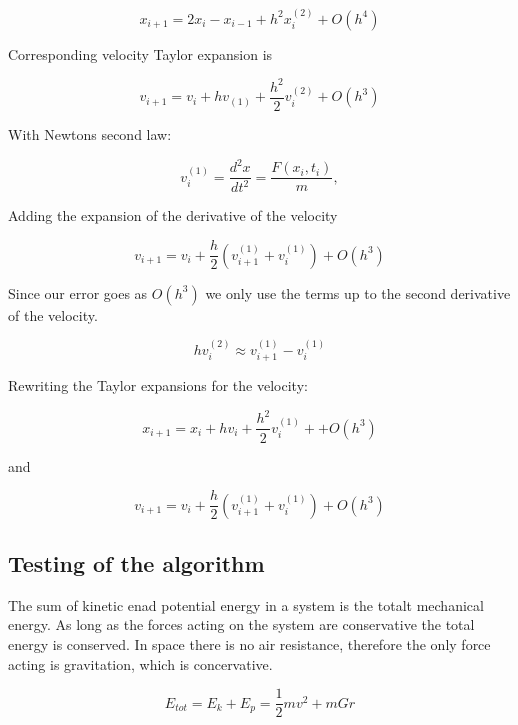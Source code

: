 \documentclass[../main.tex]{subfiles}
\begin{document}
\begin{equation}
  x_{i+1} = 2x_i - x_{i-1} + h^2 x_i^{(2)} + O(h^4)
\end{equation}

Corresponding velocity Taylor expansion is

\begin{equation}
  v_{i+1} = v_i + hv_{(1)} + \frac{h^2}{2} v_i^{(2)} + O(h^3)
\end{equation}

With Newtons second law:

\begin{equation}
  v_i^{(1)} = \frac{d^2x}{dt^2} = \frac{F(x_i, t_i)}{m},
\end{equation}

Adding the expansion of the derivative of the velocity

\begin{equation}
  v_{i+1} = v_i + \frac{h}{2}\left(v_{i+1}^{(1)} + v_i^{(1)}\right) + O(h^3)
\end{equation}

Since our error goes as $O(h^3)$ we only use the terms up to the second derivative of the velocity.

\begin{equation}
  hv_i^{(2)}\approx v_{i+1}^{(1)} - v_i^{(1)}
\end{equation}

Rewriting the Taylor expansions for the velocity:

\begin{equation}
  x_{i+1} = x_i + hv_i + \frac{h^2}{2} v_i^{(1)} + + O(h^3)
\end{equation}

and

\begin{equation}
  v_{i+1} = v_i + \frac{h}{2} \left(v_{i+1}^{(1)} + v_i^{(1)}\right) + O(h^3)
\end{equation}

\subsection{Testing of the algorithm}
The sum of kinetic enad potential energy in a system is the totalt mechanical energy. As long as the forces acting on the system are conservative the total energy is conserved. In space there is no air resistance, therefore the only force acting is gravitation, which is concervative.

$$E_{tot} = E_k + E_p = \frac{1}{2} mv^2 + mGr$$
\end{document}
